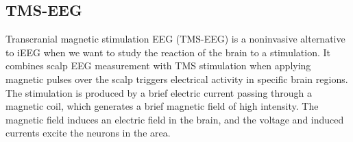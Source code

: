 \subsection{TMS-EEG}\label{sec:tms-eeg_measurement}

Transcranial magnetic stimulation EEG (TMS-EEG) is a noninvasive alternative to iEEG when we want to study the reaction of the brain to a stimulation. It combines scalp EEG measurement with TMS stimulation when applying magnetic pulses over the scalp triggers electrical activity in specific brain regions. The stimulation is produced by a brief electric current passing through a magnetic coil, which generates a brief magnetic field of high intensity. The magnetic field induces an electric field in the brain, and the voltage and induced currents excite the neurons in the area. \cite{hallett_transcranial_2007}



